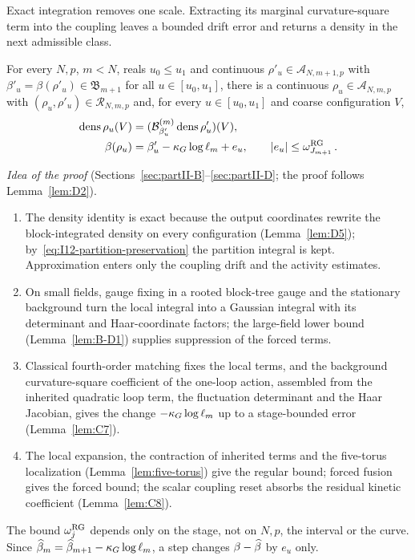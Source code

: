 Exact integration removes one scale. Extracting its marginal curvature-square term into the coupling leaves a bounded drift error and returns a density in the next admissible class.

\begin{theorem}\label{prop:RG}
For every $N,p$, $m<N$, reals $u_0\le u_1$ and continuous $\rho'_u\in\mathcal A_{N,m+1,p}$ with $\beta'_u=\beta(\rho'_u)\in\mathfrak B_{m+1}$ for all $u\in[u_0,u_1]$, there is a continuous $\rho_u\in\mathcal A_{N,m,p}$ with $(\rho_u,\rho'_u)\in\mathcal R_{N,m,p}$ and, for every $u\in[u_0,u_1]$ and coarse configuration $V$,
\begin{align*}
\operatorname{dens}\rho_u(V)&=(\mathcal{B}^{(m)}_{\beta'_u}\operatorname{dens}\rho'_u)(V),\\
\beta(\rho_u)&=\beta'_u-\kappa_G\log\ell_m+e_u,
\qquad |e_u|\le\omega_{J_{m+1}}^{\rm RG}\,.
\end{align*}
\end{theorem}

\emph{Idea of the proof} (Sections~\ref{sec:partII-B}--\ref{sec:partII-D}; the proof follows Lemma~\ref{lem:D2}).
\begin{enumerate}[label=\textup{Step \arabic*.},leftmargin=4.2em,nosep]
\item The density identity is exact because the output coordinates rewrite the block-integrated density on every configuration (Lemma~\ref{lem:D5}); by~\eqref{eq:I12-partition-preservation} the partition integral is kept. Approximation enters only the coupling drift and the activity estimates.
\item On small fields, gauge fixing in a rooted block-tree gauge and the stationary background turn the local integral into a Gaussian integral with its determinant and Haar-coordinate factors; the large-field lower bound (Lemma~\ref{lem:B-D1}) supplies suppression of the forced terms.
\item Classical fourth-order matching fixes the local terms, and the background curvature-square coefficient of the one-loop action, assembled from the inherited quadratic loop term, the fluctuation determinant and the Haar Jacobian, gives the change $-\kappa_G\log\ell_m$ up to a stage-bounded error (Lemma~\ref{lem:C7}).
\item The local expansion, the contraction of inherited terms and the five-torus localization (Lemma~\ref{lem:five-torus}) give the regular bound; forced fusion gives the forced bound; the scalar coupling reset absorbs the residual kinetic coefficient (Lemma~\ref{lem:C8}).
\end{enumerate}
The bound $\omega_j^{\rm RG}$ depends only on the stage, not on $N,p$, the interval or the curve. Since $\widehat{\beta}_m=\widehat{\beta}_{m+1}-\kappa_G\log\ell_m$, a step changes $\beta-\widehat{\beta}$ by $e_u$ only.

